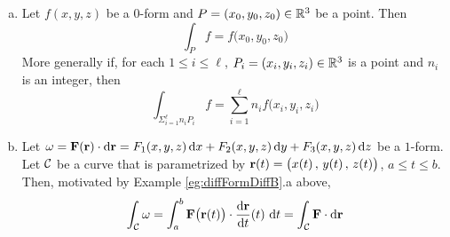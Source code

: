 \begin{defn}
             \label{def:differentialFormInt}
\begin{enumerate}[(a)]

\item
Let $f(x,y,z)$ be a  $0$-form and $P=(x_0,y_0,z_0)\in\mathbb{R}^3$ be a point.
Then
\begin{equation*}
\int_{P} f = f\big(x_0,y_0,z_0\big)
\end{equation*}
More generally if, for each $1\le i\le \ell$, $P_i=(x_i,y_i,z_i)\in\mathbb{R}^3$
is a point and $n_i$ is an integer, then
\begin{equation*}
\int_{\Sigma_{i=1}^\ell n_iP_i} f = \sum_{i=1}^\ell n_i f\big(x_i,y_i,z_i\big)
\end{equation*}
\item
Let  $\omega = \mathbf{F}(\mathbf{r})\cdot\mathrm{d}\mathbf{r}
 = F_1(x,y,z)\,\mathrm{d}x + F_2(x,y,z)\,\mathrm{d}y + F_3(x,y,z)\,\mathrm{d}z $ 
be a  $1$-form. Let $\mathcal{C}$ be a curve that is parametrized 
by $\mathbf{r}(t) = \big(x(t)\,,\,y(t)\,,\,z(t)\big)$, $a\le t\le b$. Then,
motivated by Example \ref{eg:diffFormDiffB}.a above,
\begin{equation*}
\int_{\cC}\om = \int_a^b \vF\big(\vr(t)\big)\cdot \diff{\vr}{t}(t)\ \dee{t}
              =\int_{\cC} \vF\cdot\dee{\vr}
\end{equation*}

\end{enumerate}
\end{defn}

